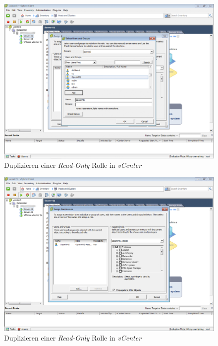 \begin{figure}[H]
	\centering
	\includegraphics[width=1.0\textwidth]{images/3rd-party/vmware/3-adding}
	\caption{Duplizieren einer \emph{Read-Only} Rolle in \emph{vCenter}}
	\label{pic:vmware-adding}
\end{figure}

\begin{figure}[H]
	\centering
	\includegraphics[width=1.0\textwidth]{images/3rd-party/vmware/4-ok}
	\caption{Duplizieren einer \emph{Read-Only} Rolle in \emph{vCenter}}
	\label{pic:vmware-ok}
\end{figure}

